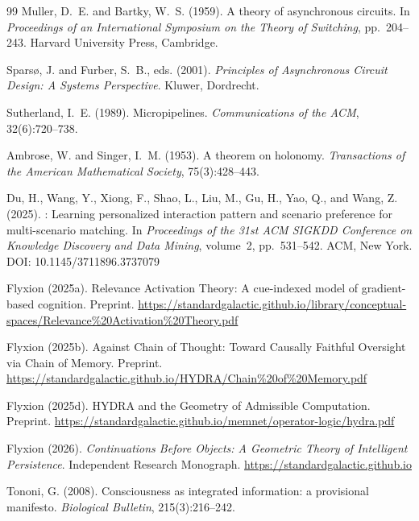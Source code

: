 \documentclass[12pt, oneside]{book}
\theoremstyle{flyxion}
\theoremstyle{definition}
\begin{document}
\begin{thebibliography}{99}
Muller, D.~E. and Bartky, W.~S. (1959).
\newblock A theory of asynchronous circuits.
\newblock In \textit{Proceedings of an International Symposium on the Theory
  of Switching}, pp.\ 204--243. Harvard University Press, Cambridge.

Spars{\o}, J. and Furber, S.~B., eds. (2001).
\newblock \textit{Principles of Asynchronous Circuit Design: A Systems
  Perspective}.
\newblock Kluwer, Dordrecht.

Sutherland, I.~E. (1989).
\newblock Micropipelines.
\newblock \textit{Communications of the ACM}, 32(6):720--738.


Ambrose, W. and Singer, I.~M. (1953).
\newblock A theorem on holonomy.
\newblock \textit{Transactions of the American Mathematical Society},
  75(3):428--443.

Du, H., Wang, Y., Xiong, F., Shao, L., Liu, M., Gu, H., Yao, Q., and Wang, Z.
  (2025).
: Learning personalized interaction pattern and scenario
  preference for multi-scenario matching.
\newblock In \textit{Proceedings of the 31st ACM SIGKDD Conference on
  Knowledge Discovery and Data Mining}, volume~2, pp.\ 531--542.
  ACM, New York.
\newblock DOI: 10.1145/3711896.3737079

Flyxion (2025a).
\newblock Relevance Activation Theory: A cue-indexed model of gradient-based
  cognition.
\newblock Preprint. \url{https://standardgalactic.github.io/library/conceptual-spaces/Relevance\%20Activation\%20Theory.pdf}

Flyxion (2025b).
\newblock Against Chain of Thought: Toward Causally Faithful Oversight
  via Chain of Memory.
\newblock Preprint. \url{https://standardgalactic.github.io/HYDRA/Chain\%20of\%20Memory.pdf}

Flyxion (2025d).
\newblock HYDRA and the Geometry of Admissible Computation.
\newblock Preprint. \url{https://standardgalactic.github.io/memnet/operator-logic/hydra.pdf}

Flyxion (2026).
\newblock \textit{Continuations Before Objects: A Geometric Theory of
  Intelligent Persistence}.
\newblock Independent Research Monograph.
  \url{https://standardgalactic.github.io}

Tononi, G. (2008).
\newblock Consciousness as integrated information: a provisional manifesto.
\newblock \textit{Biological Bulletin}, 215(3):216--242.

\end{thebibliography}
\end{document}
